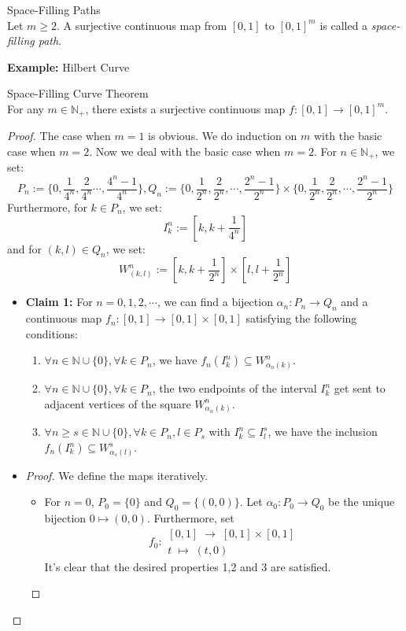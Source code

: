 \begin{definition}{Space-Filling Paths}\\
Let $m\geq 2$. A surjective continuous map from $[0,1]$ to $[0,1]^m$ is called a \textit{space-filling path}.
\end{definition}

\noindent\textbf{Example:} Hilbert Curve

\begin{theorem}{Space-Filling Curve Theorem}\\
For any $m \in \mathbb{N}_+$, there exists a surjective continuous map $f: [0,1] \to [0,1]^m$.
\end{theorem}

\begin{proof}
    The case when $m=1$ is obvious. We do induction on $m$ with the basic case when $m=2$. Now we deal with the basic case when $m=2$. For $n\in \mathbb{N}_+$, we set:
    $$P_n:= \{0, \frac{1}{4^n}, \frac{2}{4^n} \cdots, \frac{4^n-1}{4^n} \}, Q_n:= \{ 0, \frac{1}{2^n}, \frac{2}{2^n} ,\cdots, \frac{2^n- 1}{2^n} \} \times \{ 0, \frac{1}{2^n}, \frac{2}{2^n} ,\cdots, \frac{2^n- 1}{2^n} \}$$
    Furthermore, for $k \in P_n$, we set:
    $$I_k^n:= [k,k +\frac{1}{4^n}]$$
    and for $(k,l) \in Q_n$, we set:
    $$W_{(k,l)}^n := [k,k +\frac{1}{2^n}] \times [l,l +\frac{1}{2^n}]$$

    \begin{itemize}
        \item \textbf{Claim 1:} For $n=0,1,2,\cdots$, we can find a bijection $\alpha_n: P_n \to Q_n$ and a continuous map $f_n: [0,1] \to [0,1] \times [0,1]$ satisfying the following conditions:
        \begin{enumerate}
            \item $\forall n \in \mathbb{N} \cup \{0\}, \forall k \in P_n$, we have $f_n (I_k^n) \subseteq W_{\alpha_n(k)}^n$.
            \item $\forall n \in \mathbb{N} \cup \{0\}, \forall k \in P_n$, the two endpoints of the interval $I_k^n$ get sent to adjacent vertices of the square $W_{\alpha_n(k)}^n$.
            \item $\forall n \geq s \in \mathbb{N} \cup \{0\}, \forall k \in P_n, l\in P_s$ with $I_k^n \subseteq I_l^s$, we have the inclusion $f_n (I_k^n) \subseteq W_{\alpha_s(l)}^s$.
        \end{enumerate}

        \item \begin{proof}
            We define the maps iteratively.
            \begin{itemize}
                \item For $n=0$, $P_0=\{0\}$ and $Q_0 =\{(0,0)\}$. Let $\alpha_0: P_0 \to Q_0$ be the unique bijection $0 \mapsto (0,0)$. Furthermore, set
                $$f_0: \substack{[0,1] \;\to\; [0,1] \times [0,1]\\
                t \;\mapsto\; (t,0)}$$
                It's clear that the desired properties 1,2 and 3 are satisfied.


\end{itemize}
\end{proof}
\end{itemize}
\end{proof}
